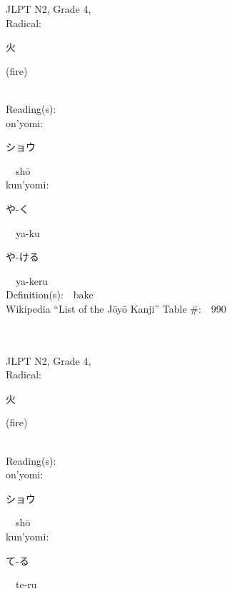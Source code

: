 \begin{multicols}{2}
{JLPT N2, Grade 4, \\Radical:\ \ {\begin{CJK}{UTF8}{min} 火 \end{CJK}} (fire) } \\
Reading(s):\ \ \\
{\hspace*{1em}}on'yomi:\ \ \\
{\hspace*{2em}}{\begin{CJK}{UTF8}{min} ショウ \end{CJK}}\ \ sh\=o\ \ \\
{\hspace*{1em}}kun'yomi:\ \ \\
{\hspace*{2em}}{\begin{CJK}{UTF8}{min} や-く \end{CJK}}\ \ ya-ku\ \ \\
{\hspace*{2em}}{\begin{CJK}{UTF8}{min} や-ける \end{CJK}}\ \ ya-keru\ \ \\
Definition(s):\ \ bake \\
Wikipedia ``List of the J\=oy\=o Kanji'' Table \#:\ \ 990 \\
\ \ \\
{\fontsize{34pt}{40pt}  }\ \ \\  %
{JLPT N2, Grade 4, \\Radical:\ \ {\begin{CJK}{UTF8}{min} 火 \end{CJK}} (fire) } \\
Reading(s):\ \ \\
{\hspace*{1em}}on'yomi:\ \ \\
{\hspace*{2em}}{\begin{CJK}{UTF8}{min} ショウ \end{CJK}}\ \ sh\=o\ \ \\
{\hspace*{1em}}kun'yomi:\ \ \\
{\hspace*{2em}}{\begin{CJK}{UTF8}{min} て-る \end{CJK}}\ \ te-ru\ \ \\

\end{multicols}
